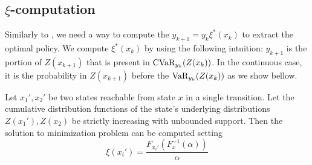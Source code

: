 \subsection{$\xi$-computation}

Similarly to , we need a way to compute the $y_{k+1}=y_{k}\xi^*(x_k)$ to extract the optimal policy. We compute $\xi^*(x_k)$ by using the following intuition: $y_{k+1}$ is the portion of $Z(x_{k+1})$ that is present in $\text{CVaR}_{y_k}(Z(x_k))$. In the continuous case, it is the probability in $Z(x_{k+1})$ before the $\text{VaR}_{y_k}(Z(x_k))$ as we show bellow.

\begin{theorem}
Let $x_1', x_2'$ be two states reachable from state $x$ in a single transition. Let the cumulative distribution functions of the state's underlying distributions $Z(x_1'), Z(x_2)$ be strictly increasing with unbounded support.
Then the solution to minimization problem  can be computed setting
\begin{equation}\label{eqn:xi-claim}
\xi ( x_i' ) = \dfrac{F_{x_i'}(F^{-1}_x(\alpha))}{\alpha} 
\end{equation}
\end{theorem}

